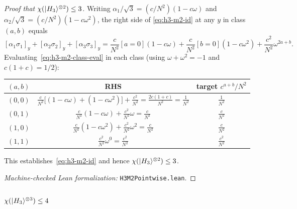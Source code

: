 \documentclass[11pt]{article}
\theoremstyle{definition}
\newcommand{\microspace}{\mspace{0.5mu}}
\newcommand{\ket}[1]{\lvert\microspace #1 \microspace \rangle}
\newcommand{\chiR}{\chi}
\newcommand{\Hth}{\ket{H_3}}
\begin{document}
\begin{proof}[Proof that $\chiR(\Hth^{\otimes 2}) \le 3$]
		Writing $\alpha_1/\sqrt 3 = (c/N^2)(1 - c\omega)$ and
		$\alpha_2/\sqrt 3 = (c/N^2)(1 - c\omega^2)$, the right side of
		\eqref{eq:h3-m2-id} at any $y$ in class $(a, b)$ equals
		\begin{equation}\label{eq:h3-m2-class-eval}
			[\alpha_1 \sigma_1]_y + [\alpha_2 \sigma_2]_y + [\alpha_3 \sigma_3]_y
			= \frac{c}{N^2}[a = 0] (1 - c \omega)
			+ \frac{c}{N^2}[b = 0] (1 - c \omega^2)
			+ \frac{c^2}{N^2} \omega^{2a + b}.
		\end{equation}
		Evaluating~\eqref{eq:h3-m2-class-eval} in each class
		(using $\omega + \omega^2 = -1$ and $c(1 + c) = 1/2$):
		\begin{center}
			\renewcommand{\arraystretch}{1.4}
			\begin{tabular}{c|c|c}
				\toprule
				$(a, b)$ & RHS & target $c^{a+b}/N^2$ \\
				\midrule
				$(0, 0)$ & $\frac{c}{N^2}\big[(1 - c\omega) + (1 - c\omega^2)\big] + \frac{c^2}{N^2}
				= \frac{2c(1+c)}{N^2} = \frac{1}{N^2}$ & $\frac{1}{N^2}$ \\
				$(0, 1)$ & $\frac{c}{N^2}(1 - c\omega) + \frac{c^2}{N^2}\omega
				= \frac{c}{N^2}$ & $\frac{c}{N^2}$ \\
				$(1, 0)$ & $\frac{c}{N^2}(1 - c\omega^2) + \frac{c^2}{N^2}\omega^2
				= \frac{c}{N^2}$ & $\frac{c}{N^2}$ \\
				$(1, 1)$ & $\frac{c^2}{N^2}\omega^0 = \frac{c^2}{N^2}$
				& $\frac{c^2}{N^2}$ \\
				\bottomrule
			\end{tabular}
		\end{center}
		This establishes~\eqref{eq:h3-m2-id} and hence
		$\chiR(\Hth^{\otimes 2}) \le 3$.

		\textit{Machine-checked Lean formalization:}
		\texttt{H3M2Pointwise.lean}.
	\end{proof}
	
	\subsubsection{\texorpdfstring{$\chiR(\Hth^{\otimes 3}) \le 4$}{chi(H3 tensor 3) <= 4}}\label{app:h3-m3}
	
\end{document}
